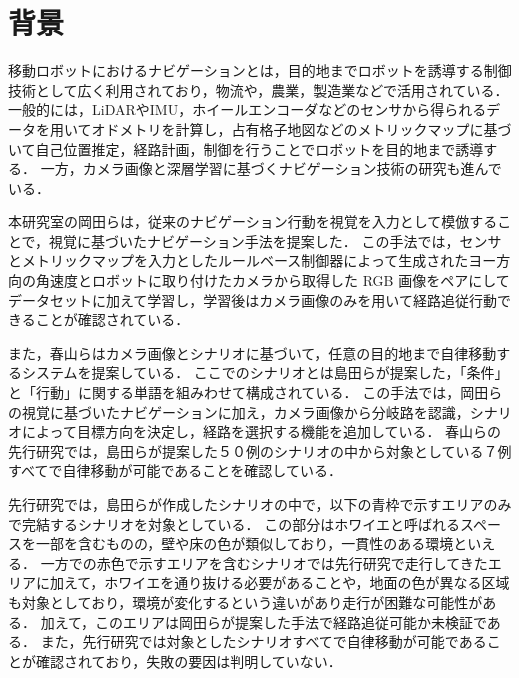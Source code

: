 
\section{背景}
移動ロボットにおけるナビゲーションとは，目的地までロボットを誘導する制御技術として広く利用されており，物流や，農業，製造業などで活用されている．
一般的には，LiDARやIMU，ホイールエンコーダなどのセンサから得られるデータを用いてオドメトリを計算し，占有格子地図などのメトリックマップに基づいて自己位置推定，経路計画，制御を行うことでロボットを目的地まで誘導する．
一方，カメラ画像と深層学習に基づくナビゲーション技術の研究も進んでいる．

本研究室の岡田らは，従来のナビゲーション行動を視覚を入力として模倣することで，視覚に基づいたナビゲーション手法を提案した．
この手法では，センサとメトリックマップを入力としたルールベース制御器によって生成されたヨー方向の角速度とロボットに取り付けたカメラから取得した RGB 画像をペアにしてデータセットに加えて学習し，学習後はカメラ画像のみを用いて経路追従行動できることが確認されている．

また，春山らはカメラ画像とシナリオに基づいて，任意の目的地まで自律移動するシステムを提案している．
ここでのシナリオとは島田らが提案した，「条件」と「行動」に関する単語を組みわせて構成されている．
この手法では，岡田らの視覚に基づいたナビゲーションに加え，カメラ画像から分岐路を認識，シナリオによって目標方向を決定し，経路を選択する機能を追加している．
春山らの先行研究では，島田らが提案した５０例のシナリオの中から対象としている７例すべてで自律移動が可能であることを確認している．

先行研究では，島田らが作成したシナリオの中で，以下の青枠で示すエリアのみで完結するシナリオを対象としている．
この部分はホワイエと呼ばれるスペースを一部を含むものの，壁や床の色が類似しており，一貫性のある環境といえる．
一方での赤色で示すエリアを含むシナリオでは先行研究で走行してきたエリアに加えて，ホワイエを通り抜ける必要があることや，地面の色が異なる区域も対象としており，環境が変化するという違いがあり走行が困難な可能性がある．
加えて，このエリアは岡田らが提案した手法で経路追従可能か未検証である．
また，先行研究では対象としたシナリオすべてで自律移動が可能であることが確認されており，失敗の要因は判明していない．


